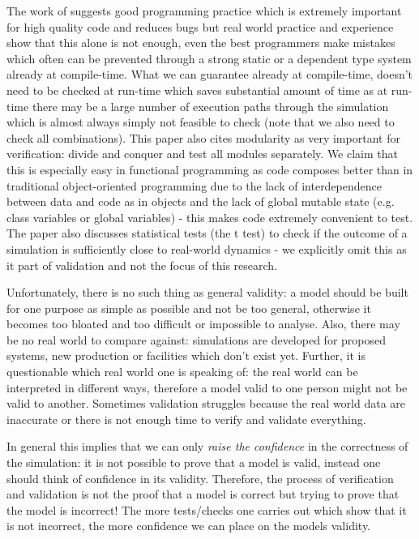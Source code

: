 The work of \cite{kleijnen_verification_1995} suggests good programming practice which is extremely important for high quality code and reduces bugs but real world practice and experience show that this alone is not enough, even the best programmers make mistakes which often can be prevented through a strong static or a dependent type system already at compile-time. What we can guarantee already at compile-time, doesn't need to be checked at run-time which saves substantial amount of time as at run-time there may be a large number of execution paths through the simulation which is almost always simply not feasible to check (note that we also need to check all combinations). This paper also cites modularity as very important for verification: divide and conquer and test all modules separately. We claim that this is especially easy in functional programming as code composes better than in traditional object-oriented programming due to the lack of interdependence between data and code as in objects and the lack of global mutable state (e.g. class variables or global variables) - this makes code extremely convenient to test. The paper also discusses statistical tests (the t test) to check if the outcome of a simulation is sufficiently close to real-world dynamics - we explicitly omit this as it part of validation and not the focus of this research.

Unfortunately, there is no such thing as general validity: a model should be built for one purpose as simple as possible and not be too general, otherwise it becomes too bloated and too difficult or impossible to analyse. Also, there may be no real world to compare against: simulations are developed for proposed systems, new production or facilities which don't exist yet. Further, it is questionable which real world one is speaking of: the real world can be interpreted in different ways, therefore a model valid to one person might not be valid to another. Sometimes validation struggles because the real world data are inaccurate or there is not enough time to verify and validate everything.

In general this implies that we can only \textit{raise the confidence} in the correctness of the simulation: it is not possible to prove that a model is valid, instead one should think of confidence in its validity. Therefore, the process of verification and validation is not the proof that a model is correct but trying to prove that the model is incorrect! The more tests/checks one carries out which show that it is not incorrect, the more confidence we can place on the models validity.

